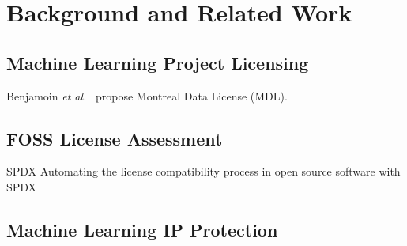 \section{Background and Related Work}

\subsection{Machine Learning Project Licensing}


Benjamoin \textit{et al.}~\cite{benjamin2019towards} propose Montreal Data License (MDL).

\subsection{FOSS License Assessment}
SPDX
Automating the license compatibility process in open source software with SPDX

\subsection{Machine Learning IP Protection}
